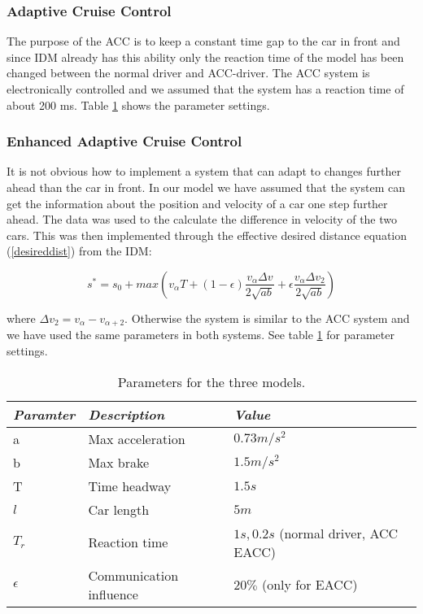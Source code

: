 \subsubsection{Adaptive Cruise Control}
The purpose of the ACC is to keep a constant time gap to the car in front
and since IDM already has this ability only the reaction time of the model
has been changed between the normal driver and ACC-driver. The ACC system
is electronically controlled and we assumed that the system has a reaction
time of about 200 ms. Table \ref{config} shows the parameter settings.

\subsubsection{Enhanced Adaptive Cruise Control}
It is not obvious how to implement a system that can adapt to changes further
ahead than the car in front. In our model we have assumed that the system
can get the information about the position and velocity of a car one step further
ahead. The data was used to the calculate the difference
in velocity of the two cars. This was then implemented through the effective desired
distance equation (\ref{desireddist}) from the IDM:
 
\begin{equation}
s^\ast = s_0 + max \left (v_\alpha T + (1-\epsilon
)\frac{v_\alpha \Delta v}{2\sqrt{ab}} + \epsilon \frac{v_\alpha \Delta
v_2}{2\sqrt{ab}}\right )
\end{equation}

where $ \Delta v_2 = v_\alpha - v_{\alpha +2} $. Otherwise the system is
similar to the ACC system and we have used the same parameters in both
systems. See table \ref{config} for parameter settings.

\begin{center}
\begin{table}[H]
\begin{tabular}{| l | l | l |} \hline
\emph{Paramter} & \emph{Description} & \emph{Value}\\ \hline
a & Max acceleration & $ 0.73 \unit{m/s^2} $\\ \hline
b & Max brake & $ 1.5 \unit{m/s^2} $\\ \hline
T & Time headway & $ 1.5 \unit{s} $ \\ \hline
$ l $ & Car length & $ 5 \unit{m} $ \\ \hline
$ T_r $ & Reaction time & $ 1 \unit{s}, 0.2 \unit{s} $ (normal driver, ACC\/ EACC) \\ \hline
$ \epsilon $ & Communication influence & $ 20 \% $ (only for EACC) \\ \hline
\end{tabular}
\caption{\label{config} Parameters for the three models.}
\end{table}
\end{center}


